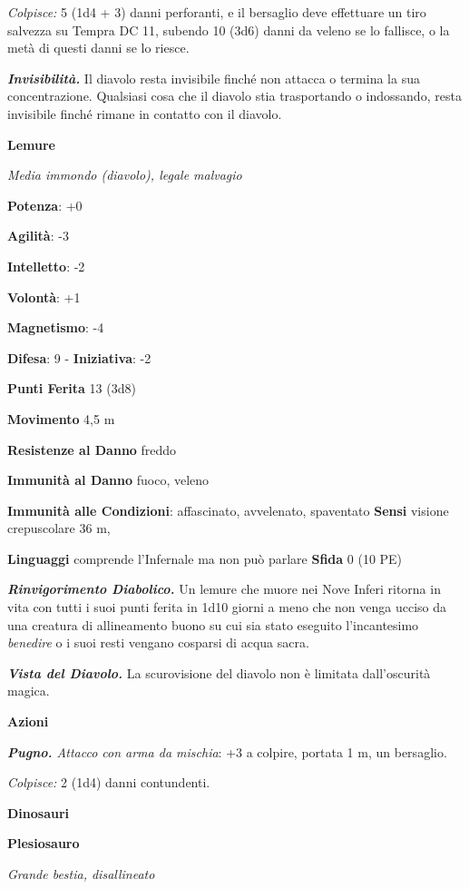 \begin{multicols}{2}
\emph{Colpisce:} 5 (1d4 + 3) danni perforanti, e il bersaglio deve
effettuare un tiro salvezza su Tempra DC 11, subendo 10 (3d6)
danni da veleno se lo fallisce, o la metà di questi danni se lo riesce.

\emph{\textbf{Invisibilità.}} Il diavolo resta invisibile finché non
attacca o termina la sua concentrazione. Qualsiasi cosa che il diavolo
stia trasportando o indossando, resta invisibile finché rimane in
contatto con il diavolo.

\textbf{Lemure}

\emph{Media immondo (diavolo), legale malvagio}

\textbf{Potenza}: +0

\textbf{Agilità}: -3

\textbf{Intelletto}: -2

\textbf{Volontà}: +1

\textbf{Magnetismo}: -4

\textbf{Difesa}: 9 - \textbf{Iniziativa}: -2

\textbf{Punti Ferita} 13 (3d8)

\textbf{Movimento} 4,5 m

\textbf{Resistenze al Danno} freddo

\textbf{Immunità al Danno} fuoco, veleno

\textbf{Immunità alle Condizioni}: affascinato, avvelenato, spaventato
\textbf{Sensi} visione crepuscolare 36 m, 

\textbf{Linguaggi} comprende l'Infernale ma non può parlare
\textbf{Sfida} 0 (10 PE)\smallskip

\emph{\textbf{Rinvigorimento Diabolico.}} Un lemure che muore nei Nove
Inferi ritorna in vita con tutti i suoi punti ferita in 1d10 giorni a
meno che non venga ucciso da una creatura di allineamento buono su cui
sia stato eseguito l'incantesimo \emph{benedire} o i suoi resti vengano
cosparsi di acqua sacra.

\emph{\textbf{Vista del Diavolo.}} La scurovisione del diavolo non è
limitata dall'oscurità magica.

\smallskip\textbf{Azioni}

\emph{\textbf{Pugno.} Attacco con arma da mischia}: +3 a colpire,
portata 1 m, un bersaglio.

\emph{Colpisce:} 2 (1d4) danni contundenti.

\textbf{Dinosauri}

\textbf{Plesiosauro}

\emph{Grande bestia, disallineato}


\end{multicols}
